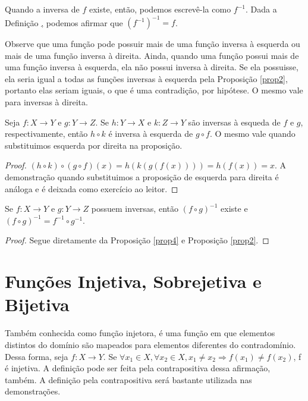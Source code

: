 Quando a inversa de $f$ existe, então, podemos escrevê-la como $f^{-1}$. Dada a Definição \hyperlink{def4}, 
podemos afirmar que $(f^{-1})^{-1} = f$.  

Observe que uma função pode possuir mais de uma função inversa à esquerda ou mais de uma função inversa 
à direita. Ainda, quando uma função possui mais de uma função inversa à esquerda, ela não possui inversa 
à direita. Se ela possuisse, ela seria igual a todas as funções inversas à esquerda pela Proposição \ref{prop2}, 
portanto elas seriam iguais, o que é uma contradição, por hipótese. O mesmo vale para inversas à direita. 

\begin{theorem}
     \label{prop4}
     Seja $f: X \to Y $ e $g: Y \to Z$. Se $h: Y \to X$ e $k: Z \to Y$ são inversas à esqueda de $f$ e $g$, 
     respectivamente, então $h \circ k$ é inversa à esquerda de $g \circ f$. O mesmo vale quando substituimos
     esquerda por direita na proposição. 
\end{theorem}

\begin{proof}
 $(h \circ k)\circ(g \circ f)(x) = h(k(g(f(x)))) = h(f(x)) = x $. A demonstração quando substituimos a proposição
 de esquerda para direita é análoga e é deixada como exercício ao leitor.
\end{proof}

\begin{corollary}
    \label{cor1}
    Se $f: X \to Y$ e $g: Y \to Z$ possuem inversas, então $(f \circ g)^{-1}$ existe e 
    $(f \circ g)^{-1} = f^{-1} \circ g^{-1}$.
\end{corollary}

\begin{proof}
    Segue diretamente da Proposição \ref{prop4} e Proposição \ref{prop2}.  
\end{proof}

\section{Funções Injetiva, Sobrejetiva e Bijetiva}

\begin{definition}
    \label{def5}
    Também conhecida como função injetora, é uma função em que elementos distintos do domínio são 
    mapeados para elementos diferentes do contradomínio. Dessa forma, seja $f: X \to Y$. Se 
    $\forall x_1 \in X, \forall x_2 \in X, x_1 \neq x_2 \Rightarrow f(x_1) \neq f(x_2) $, f é injetiva. 
    A definição pode ser feita pela contrapositiva dessa afirmação, também. A definição pela contrapositiva
    será bastante utilizada nas demonstrações. 
\end{definition}


